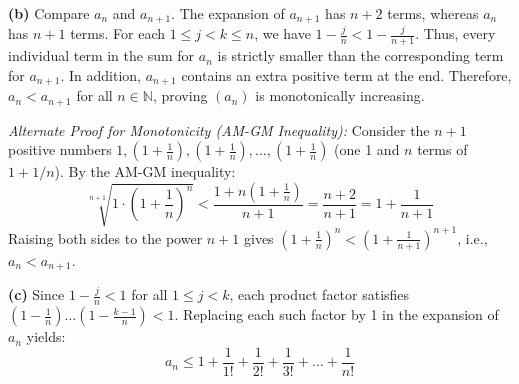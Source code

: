 \documentclass[12pt]{article}
\begin{document}
\textbf{(b)} Compare $a_n$ and $a_{n+1}$. The expansion of $a_{n+1}$ has $n+2$ terms, whereas $a_n$ has $n+1$ terms. For each $1 \le j < k \le n$, we have $1 - \frac{j}{n} < 1 - \frac{j}{n+1}$. Thus, every individual term in the sum for $a_n$ is strictly smaller than the corresponding term for $a_{n+1}$. In addition, $a_{n+1}$ contains an extra positive term at the end. Therefore, $a_n < a_{n+1}$ for all $n \in \mathbb{N}$, proving $(a_n)$ is monotonically increasing.

\medskip
\noindent\textit{Alternate Proof for Monotonicity (AM-GM Inequality):} Consider the $n+1$ positive numbers $1, \left(1 + \frac{1}{n}\right), \left(1 + \frac{1}{n}\right), \dots, \left(1 + \frac{1}{n}\right)$ (one 1 and $n$ terms of $1+1/n$). By the AM-GM inequality:
\[
\sqrt[n+1]{1 \cdot \left(1 + \frac{1}{n}\right)^n} < \frac{1 + n\left(1 + \frac{1}{n}\right)}{n+1} = \frac{n+2}{n+1} = 1 + \frac{1}{n+1}
\]
Raising both sides to the power $n+1$ gives $\left(1 + \frac{1}{n}\right)^n < \left(1 + \frac{1}{n+1}\right)^{n+1}$, i.e., $a_n < a_{n+1}$.

\medskip
\textbf{(c)} Since $1 - \frac{j}{n} < 1$ for all $1 \le j < k$, each product factor satisfies $\left(1 - \frac{1}{n}\right)\dots\left(1 - \frac{k-1}{n}\right) < 1$. Replacing each such factor by 1 in the expansion of $a_n$ yields:
\[
a_n \le 1 + \frac{1}{1!} + \frac{1}{2!} + \frac{1}{3!} + \dots + \frac{1}{n!}
\]
\end{document}
